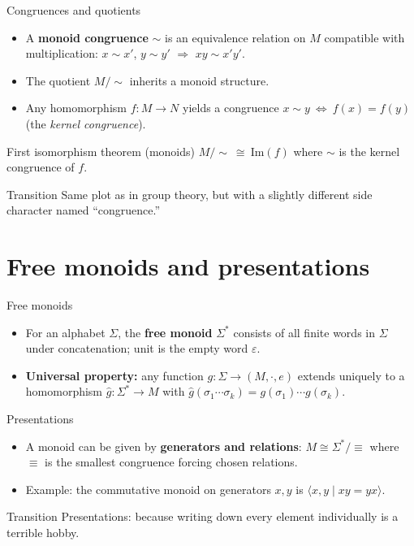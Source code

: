 \documentclass[aspectratio=169,11pt]{beamer}
\newcommand{\Img}{\mathrm{Im}}
\begin{document}
\begin{frame}{Congruences and quotients}
\begin{itemize}
  \item A \textbf{monoid congruence} $\sim$ is an equivalence relation on $M$ compatible with multiplication: $x\sim x'$, $y\sim y'$ $\Rightarrow$ $xy\sim x'y'$.
  \item The quotient $M/{\sim}$ inherits a monoid structure.
  \item Any homomorphism $f:M\to N$ yields a congruence $x\sim y\ \Leftrightarrow\ f(x)=f(y)$ (the \emph{kernel congruence}).
\end{itemize}
\begin{block}{First isomorphism theorem (monoids)}
$M/\!\sim\ \cong\ \Img(f)$ where $\sim$ is the kernel congruence of $f$.
\end{block}
\begin{block}{Transition}
Same plot as in group theory, but with a slightly different side character named “congruence.”
\end{block}
\end{frame}

\section{Free monoids and presentations}
\begin{frame}{Free monoids}
\begin{itemize}
  \item For an alphabet $\Sigma$, the \textbf{free monoid} $\Sigma^\ast$ consists of all finite words in $\Sigma$ under concatenation; unit is the empty word $\varepsilon$.
  \item \textbf{Universal property:} any function $g:\Sigma\to (M,\cdot,e)$ extends uniquely to a homomorphism $\widehat{g}:\Sigma^\ast\to M$ with $\widehat{g}(\sigma_1\cdots\sigma_k)=g(\sigma_1)\cdots g(\sigma_k)$.
\end{itemize}
\end{frame}

\begin{frame}{Presentations}
\begin{itemize}
  \item A monoid can be given by \textbf{generators and relations}: $M\cong \Sigma^\ast/\!\!\equiv$ where $\equiv$ is the smallest congruence forcing chosen relations.
  \item Example: the commutative monoid on generators $x,y$ is $\langle x,y \mid xy=yx\rangle$.
\end{itemize}
\begin{block}{Transition}
Presentations: because writing down every element individually is a terrible hobby.
\end{block}
\end{frame}
\end{document}
